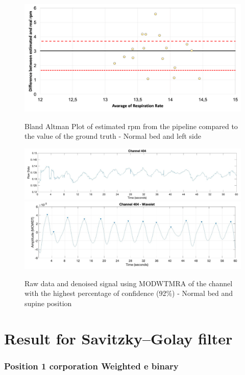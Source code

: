 \begin{figure}[p]
  \centering
  \includegraphics[width=\textwidth]{img/balnd2.png}

  \caption{Bland Altman Plot of estimated rpm from the pipeline compared to the value of the ground truth - Normal bed and left side}
  \label{fig:baln2}
  \vspace{1.5cm}
  \includegraphics[width=\textwidth]{img/404.jpg}
  \includegraphics[width=\textwidth]{img/404_wave.jpg}
\caption{Raw data and denoised signal using MODWTMRA of the channel with the highest percentage of confidence (92\%) - Normal bed and supine position}
  \label{fig:rec}
\end{figure}









\clearpage
\section{Result for Savitzky–Golay filter} \label{cap:ResultSG}
\subsubsection*{Position 1 corporation Weighted e binary}
